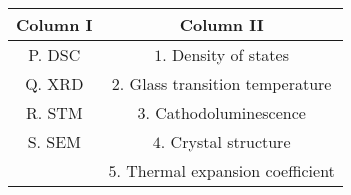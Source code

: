 \begin{tabular}[12pt]{ |c|c|}
    \hline
    \textbf{Column I} & \textbf{Column II}\\
    \hline
    P. DSC & $1$. Density of states\\
    \hline 
    Q. XRD & $2$. Glass transition temperature\\
    \hline
    R. STM & $3$. Cathodoluminescence\\
    \hline
    S. SEM& $4$. Crystal structure\\
    \hline
    & $5$. Thermal expansion coefficient\\
    \hline
\end{tabular}
